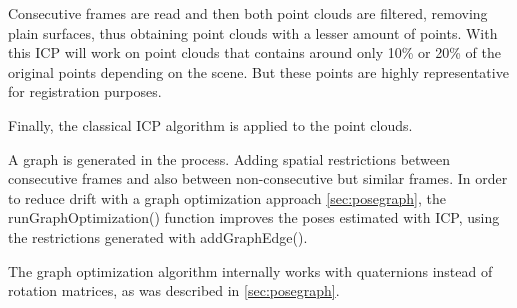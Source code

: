 Consecutive frames are read and then both point clouds are filtered, removing plain surfaces, thus obtaining point clouds 
with a lesser amount of points. With this ICP will work on point clouds that contains around 
only 10\% or 20\% of the original points depending on the scene. But these points are highly representative for registration purposes.

Finally, the classical ICP algorithm is applied to the point clouds.

A graph is generated in the process. Adding spatial restrictions between consecutive frames and also between non-consecutive but similar 
frames. In order to reduce drift with a graph optimization approach \ref{sec:posegraph}, the runGraphOptimization() function 
improves the poses estimated with 
 ICP, using the restrictions generated with addGraphEdge(). 


The graph optimization algorithm internally works with quaternions instead of rotation matrices, as was described in \ref{sec:posegraph}.

